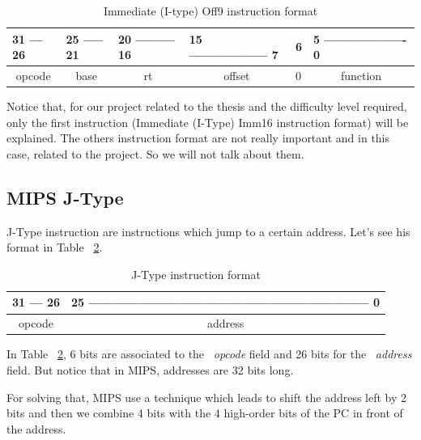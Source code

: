 \documentclass[
  oneside,
  11pt, a4paper,
  footinclude=true,
  headinclude=true,
  cleardoublepage=empty
]{scrbook}
\begin{document}
\begin{table}[h!]
\centering
\begin{tabular}{l|l|l|l|l|l}
31 --- 26                    & 25 ----- 21               & 20 --------- 16         & 15 ------------------ 7     & 6 & 5 ------------------- 0       \\ \hline
\multicolumn{1}{|c|}{opcode} & \multicolumn{1}{c|}{base} & \multicolumn{1}{c|}{rt} & \multicolumn{1}{c|}{offset} & 0 & \multicolumn{1}{c|}{function} \\ \hline
\end{tabular}
\caption{Immediate (I-type) Off9 instruction format}
\label{tbl:imm_off9_instruction_format}
\end{table}

Notice that, for our project related to the thesis and the difficulty level required, only the first instruction (Immediate (I-Type) Imm16 instruction format) will be explained. The others instruction format are not really important and in this case, related to the project. So we will not talk about them.



\subsection{MIPS J-Type}
J-Type instruction are instructions which jump to a certain address.
Let's see his format in Table ~\ref{tbl:j-type_instruction_format}.

\begin{table}[h!]
\centering
\begin{tabular}{l|l|l|l|l|l}
31 --- 26                    & \multicolumn{5}{l}{25 ----------------------------------------------------------------- 0} \\ \hline
\multicolumn{1}{|c|}{opcode} & \multicolumn{5}{c|}{address}                                                                \\ \hline
\end{tabular}
\caption{J-Type instruction format}
\label{tbl:j-type_instruction_format}
\end{table}

In Table ~\ref{tbl:j-type_instruction_format}, 6 bits are associated to the ~\textit{opcode} field and 26 bits for the ~\textit{address} field.
But notice that in MIPS, addresses are 32 bits long. 

For solving that, MIPS use a technique which leads to shift the address left by 2 bits and then we combine 4 bits with the 4 high-order bits of the PC in front of the address.
\end{document}
